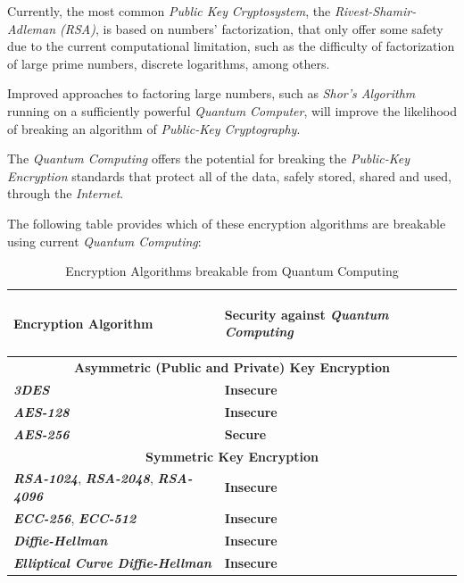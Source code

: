 \documentclass[conference]{IEEEtran}
\begin{document}
\vspace{4pt}

Currently, the most common \textit{Public Key} \textit{Cryptosystem}, the \textit{Rivest-Shamir-Adleman (RSA)}, is based on numbers' factorization, that only offer some safety due to the current computational limitation, such as the difficulty of factorization of large prime numbers, discrete logarithms, among others.

\vspace{4pt}

Improved approaches to factoring large numbers, such as \textit{Shor's Algorithm} running on a sufficiently powerful \textit{Quantum Computer}, will improve the likelihood of breaking an algorithm of \textit{Public-Key Cryptography}.

\vspace{4pt}

The \textit{Quantum Computing} offers the potential for breaking the \textit{Public-Key Encryption} standards that protect all of the data, safely stored, shared and used, through the \textit{Internet}.

\vspace{4pt}

The following table provides which of these encryption algorithms are breakable using current \textit{Quantum Computing}:

\begin{table}[!hp]
\centering
    \caption{Encryption Algorithms breakable from Quantum Computing}
    \begin{tabular}{ |p{4cm}|p{2.5cm}| }
     \hline
     \begin{center}
     \textbf{Encryption Algorithm}\end{center} & \begin{center}\textbf{Security against \textit{Quantum Computing}}\end{center}\\
     \hline
     \hline
     \multicolumn{2}{|c|}{\textbf{Asymmetric (Public and Private) Key Encryption}} \\
     \hline
     \hline
     \textit{\textbf{3DES}} & \textbf{Insecure} \\
     \hline
     \textit{\textbf{AES-128}} & \textbf{Insecure} \\
     \hline
     \textit{\textbf{AES-256}} & \textbf{Secure} \\
     \hline
     \hline
     \multicolumn{2}{|c|}{\textbf{Symmetric Key Encryption}} \\
     \hline
     \hline
     \textit{\textbf{RSA-1024}}, \textit{\textbf{RSA-2048}}, \textit{\textbf{RSA-4096}} & \textbf{Insecure} \\
     \hline
     \textit{\textbf{ECC-256}}, \textit{\textbf{ECC-512}} & \textbf{Insecure} \\
     \hline
     \textit{\textbf{Diffie-Hellman}} & \textbf{Insecure} \\
     \hline
     \textit{\textbf{Elliptical Curve Diffie-Hellman}} & \textbf{Insecure} \\
     \hline
    \end{tabular}
\end{table}
\end{document}
